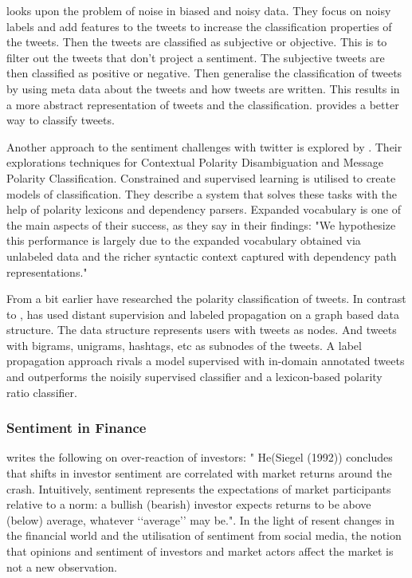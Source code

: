 \cite[]{barbosa10} looks upon the problem of noise in biased and noisy data. 
They focus on noisy labels and add features to the tweets to increase the
classification properties of the tweets. Then the tweets are classified as
subjective or objective. This is to filter out the tweets that don't project a
sentiment. The subjective tweets are then classified as positive or negative.
Then \cite[]{barbosa10} generalise the classification of tweets by using meta
data about the tweets and how tweets are written. This results in a more
abstract representation of tweets and the classification. \cite[]{barbosa10}
provides a better way to classify tweets.

Another approach to the sentiment challenges with twitter is explored by
\cite[]{becker13}. Their explorations techniques for Contextual Polarity Disambiguation
and Message Polarity Classification. Constrained and supervised learning is
utilised to create models of classification. They describe a system that solves
these tasks with the help of polarity lexicons and dependency parsers. 
Expanded vocabulary is one of the main aspects of their success, as they say in
their findings: "We hypothesize this performance is largely due to the expanded vocabulary
obtained via unlabeled data and the richer syntactic context captured with
dependency path representations." \cite[]{becker13}

From a bit earlier \cite[]{sperious11} have researched the polarity classification of tweets. 
In contrast to \cite[]{becker13}, \cite[]{sperious11} has used distant
supervision and labeled propagation on a graph based data structure. The data
structure represents users with tweets as nodes. And tweets with bigrams,
unigrams, hashtags, etc as subnodes of the tweets. A label propagation approach
rivals a model supervised with in-domain annotated tweets and outperforms the
noisily supervised classifier and a lexicon-based polarity ratio classifier.
\cite[]{sperious11} 

\subsubsection{Sentiment in Finance}
\cite[p2]{Brown20041} writes the following on over-reaction of investors: "
He(Siegel (1992)) concludes that shifts in investor sentiment are correlated
with market returns around the crash. Intuitively, sentiment represents the
expectations of market participants relative to a norm: a bullish (bearish)
investor expects returns to be above (below) average, whatever ‘‘average’’ may
be.". In the light of resent changes in the financial world and the utilisation
of sentiment from social media, the notion that opinions and sentiment of
investors and market actors affect the market is not a new observation.

